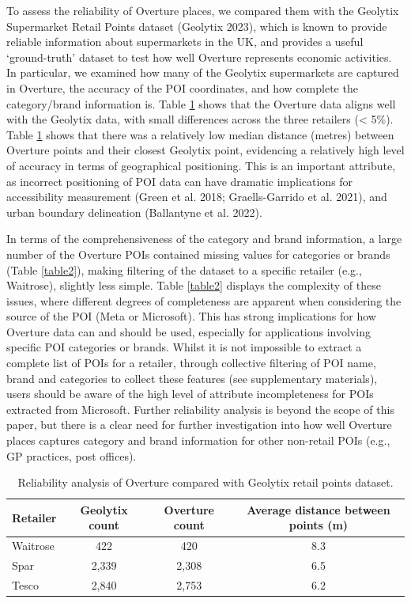 \documentclass[
]{article}
\begin{document}
To assess the reliability of Overture places, we compared them with the
Geolytix Supermarket Retail Points dataset (Geolytix 2023), which is
known to provide reliable information about supermarkets in the UK, and
provides a useful `ground-truth' dataset to test how well Overture
represents economic activities. In particular, we examined how many of
the Geolytix supermarkets are captured in Overture, the accuracy of the
POI coordinates, and how complete the category/brand information is.
Table \ref{table1} shows that the Overture data aligns well with the
Geolytix data, with small differences across the three retailers
(\textless{} 5\%). Table \ref{table1} shows that there was a relatively
low median distance (metres) between Overture points and their closest
Geolytix point, evidencing a relatively high level of accuracy in terms
of geographical positioning. This is an important attribute, as
incorrect positioning of POI data can have dramatic implications for
accessibility measurement (Green et al. 2018; Graells-Garrido et al.
2021), and urban boundary delineation (Ballantyne et al. 2022).

In terms of the comprehensiveness of the category and brand information,
a large number of the Overture POIs contained missing values for
categories or brands (Table \ref{table2}), making filtering of the
dataset to a specific retailer (e.g., Waitrose), slightly less simple.
Table \ref{table2} displays the complexity of these issues, where
different degrees of completeness are apparent when considering the
source of the POI (Meta or Microsoft). This has strong implications for
how Overture data can and should be used, especially for applications
involving specific POI categories or brands. Whilst it is not impossible
to extract a complete list of POIs for a retailer, through collective
filtering of POI name, brand and categories to collect these features
(see supplementary materials), users should be aware of the high level
of attribute incompleteness for POIs extracted from Microsoft. Further
reliability analysis is beyond the scope of this paper, but there is a
clear need for further investigation into how well Overture places
captures category and brand information for other non-retail POIs (e.g.,
GP practices, post offices).

\def\arraystretch{1.5}
\begin{table}[]
\caption{\label{table1} Reliability analysis of Overture compared with Geolytix retail points dataset.}
\centering
\bigskip
\begin{tabular}{lccc}
\hline
\textbf{Retailer} & \textbf{Geolytix count} & \textbf{Overture count} & \textbf{Average distance between points (m)} \\
\hline
Waitrose & 422            & 420            & 8.3                                 \\
Spar     & 2,339          & 2,308          & 6.5                                 \\
Tesco    & 2,840          & 2,753          & 6.2 \\
\hline
\end{tabular}
\end{table}
\end{document}
